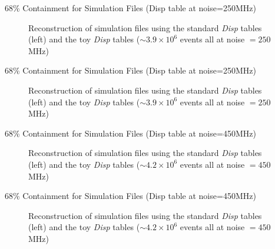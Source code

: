 \documentclass[xcolor=dvipsnames]{beamer}
\newcommand{\e}[1]{\times 10^{#1}}
\newcommand{\disp}{\textit{Disp }}
\begin{document}
\begin{frame}{68\% Containment for Simulation Files (Disp table at noise=250MHz)}
  \begin{figure}[H]
  \centering
  \caption{Reconstruction of simulation files using the standard \disp tables (left) and the toy \disp tables ($\sim3.9\e6$ events all at noise $= 250$ MHz)}
\end{figure}
\end{frame}
\begin{frame}{68\% Containment for Simulation Files (Disp table at noise=250MHz)}
  \begin{figure}[H]
  \centering
  \caption{Reconstruction of simulation files using the standard \disp tables (left) and the toy \disp tables ($\sim3.9\e6$ events all at noise $= 250$ MHz)}
\end{figure}
\end{frame}

\begin{frame}{68\% Containment for Simulation Files (Disp table at noise=450MHz)}
  \begin{figure}[H]
  \centering
  \caption{Reconstruction of simulation files using the standard \disp tables (left) and the toy \disp tables ($\sim 4.2\e6$ events all at noise $= 450$ MHz)}
\end{figure}
\end{frame}

\begin{frame}{68\% Containment for Simulation Files (Disp table at noise=450MHz)}
  \begin{figure}[H]
  \centering
  \caption{Reconstruction of simulation files using the standard \disp tables (left) and the toy \disp tables ($\sim 4.2\e6$ events all at noise $= 450$ MHz)}
\end{figure}
\end{frame}
\end{document}
